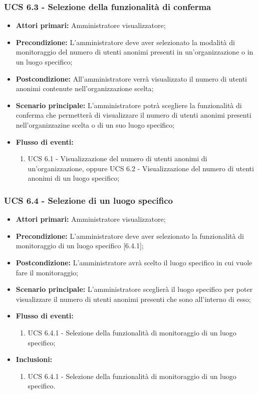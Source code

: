 \subsubsection{UCS 6.3 - Selezione della funzionalità di conferma}%
\begin{itemize}
	\item \textbf{Attori primari:} Amministratore visualizzatore;
	\item \textbf{Precondizione:} L'amministratore deve aver selezionato la modalità di monitoraggio del numero di utenti anonimi presenti in un'organizzazione o in un luogo specifico;
	\item \textbf{Postcondizione:} All'amministratore verrà visualizzato il numero di utenti anonimi contenute nell'organizzazione scelta;
	\item \textbf{Scenario principale:} L'amministratore potrà scegliere la funzionalità di conferma che permetterà di visualizzare il numero di utenti anonimi presenti nell'organizzazine scelta o di un suo luogo specifico;
	\item \textbf{Flusso di eventi:} 
	\begin{enumerate}
		\item UCS 6.1 - Visualizzazione del numero di utenti anonimi di un'organizzazione, oppure UCS 6.2 - Visualizzazione del numero di utenti anonimi di un luogo specifico;
	\end{enumerate}
\end{itemize}

\subsubsection{UCS 6.4 - Selezione di un luogo specifico}%
\begin{itemize}
	\item \textbf{Attori primari:} Amministratore visualizzatore;
	\item \textbf{Precondizione:} L'amministratore deve aver selezionato la funzionalità di monitoraggio di un luogo specifico [6.4.1];
	\item \textbf{Postcondizione:} L'amministratore avrà scelto il luogo specifico in cui vuole fare il monitoraggio;
	\item \textbf{Scenario principale:} L'amministratore sceglierà il luogo specifico per poter visualizzare il numero di utenti anonimi presenti che sono all'interno di esso;
	\item \textbf{Flusso di eventi:} 
	\begin{enumerate}
		\item UCS 6.4.1 - Selezione della funzionalità di monitoraggio di un luogo specifico;
	\end{enumerate}
	\item \textbf{Inclusioni:}
	\begin{enumerate}
		\item UCS 6.4.1 - Selezione della funzionalità di monitoraggio di un luogo specifico.
	\end{enumerate}
\end{itemize}

